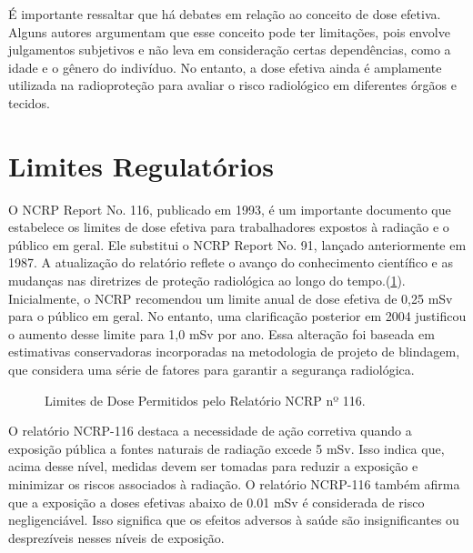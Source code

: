 \documentclass[11pt,a4paper]{article}
\begin{document}
	É importante ressaltar que há debates em relação ao conceito de dose efetiva. Alguns autores argumentam que esse conceito pode ter limitações, pois envolve julgamentos subjetivos e não leva em consideração certas dependências, como a idade e o gênero do indivíduo. No entanto, a dose efetiva ainda é amplamente utilizada na radioproteção para avaliar o risco radiológico em diferentes órgãos e tecidos.


\section{Limites Regulatórios}

	O NCRP Report No. 116, publicado em 1993, é um importante documento que estabelece os limites de dose efetiva para trabalhadores expostos à radiação e o público em geral. Ele substitui o NCRP Report No. 91, lançado anteriormente em 1987. A atualização do relatório reflete o avanço do conhecimento científico e as mudanças nas diretrizes de proteção radiológica ao longo do tempo.(\ref{fig:prLimitesAnuais}).  Inicialmente, o NCRP recomendou um limite anual de dose efetiva de 0,25 mSv para o público em geral. No entanto, uma clarificação posterior em 2004 justificou o aumento desse limite para 1,0 mSv por ano. Essa alteração foi baseada em estimativas conservadoras incorporadas na metodologia de projeto de blindagem, que considera uma série de fatores para garantir a segurança radiológica.

	\begin{figure}[!h]
			\centering
			\caption{Limites de Dose Permitidos pelo Relatório NCRP nº 116.}
			\label{fig:prLimitesAnuais}
	\end{figure}

	O relatório NCRP-116 destaca a necessidade de ação corretiva quando a exposição pública a fontes naturais de radiação excede 5 mSv. Isso indica que, acima desse nível, medidas devem ser tomadas para reduzir a exposição e minimizar os riscos associados à radiação. O relatório NCRP-116 também afirma que a exposição a doses efetivas abaixo de 0.01 mSv é considerada de risco negligenciável. Isso significa que os efeitos adversos à saúde são insignificantes ou desprezíveis nesses níveis de exposição.
\end{document}
